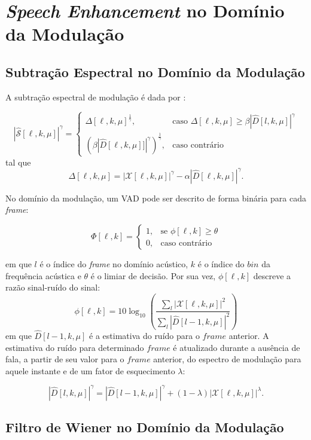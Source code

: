 \section{\textit{Speech Enhancement} no Domínio da Modulação}
\subsection{Subtração Espectral no Domínio da Modulação}

A subtração espectral de modulação é dada por \cite{paliwal2015}:

\begin{equation}
    |\hat{\mathcal{S}}[\ell, k, \mu]|^\gamma =
    \begin{cases}
        \Delta[\ell, k, \mu]^\frac{1}{\gamma}, &  \text{caso } \Delta[\ell, k, \mu] \geq  \beta|\hat{D}[l, k, \mu]|^\gamma \\
        (\beta|\hat{D}[\ell, k, \mu]]|^\gamma)^\frac{1}{\gamma}, &  \text{caso contrário}
    \end{cases}
\end{equation}
tal que
\begin{equation}
    \Delta[\ell, k, \mu] = |\mathcal{X}[\ell, k, \mu]|^\gamma - \alpha|\hat{D}[\ell, k, \mu]|^\gamma.
\end{equation}

No domínio da modulação, um VAD
pode ser descrito de forma binária para cada \textit{frame}:

\begin{equation}
    \Phi[\ell, k] =
    \begin{cases}
        1, & \text{se }\phi[\ell, k] \geq \theta\\
        0, & \text{caso contrário}
    \end{cases}
\end{equation}

em que $l$ é o índice do \textit{frame} no domínio acústico, $k$ é o índice do
$bin$ da frequência acústica e $\theta$ é o limiar de decisão. Por sua vez,
$\phi[\ell, k]$ descreve a razão sinal-ruído do sinal:
\begin{equation}
    \phi[\ell, k] = 10 \log_{10} \left( \frac{\sum_{l}|\mathcal{X}[\ell,k, \mu]|^2}{\sum_{l}|\hat{D}[l-1,k, \mu]|^2} \right)
\end{equation}
 em que $\hat{D}[l-1,k, \mu]$ é a estimativa do ruído para o $frame$ anterior. A
 estimativa do ruído para determinado $frame$ é atualizado durante a ausência de
 fala, a partir de seu valor para o $frame$ anterior, do espectro
 de modulação para aquele instante e de um fator de esquecimento $\lambda$:

\begin{equation}
    |\hat{D}[l, k, \mu]|^\gamma = |\hat{D}[l-1, k, \mu]|^\gamma + (1-\lambda)|\mathcal{X}[\ell, k, \mu]|^\lambda.
\end{equation}



\subsection{Filtro de Wiener no Domínio da Modulação}